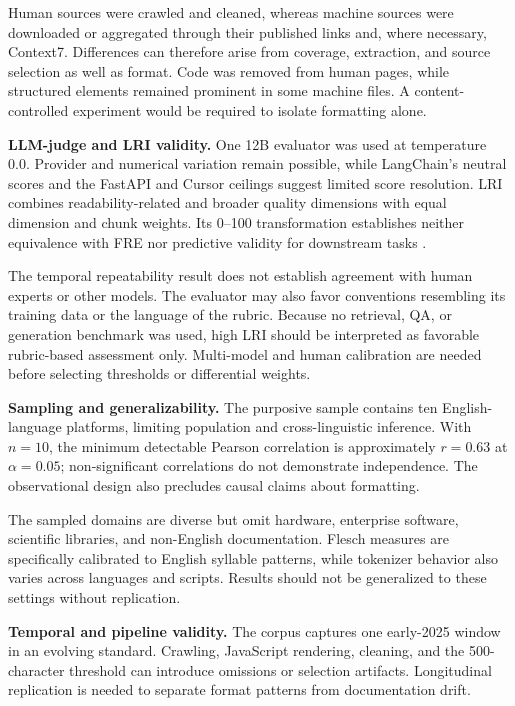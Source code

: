 \documentclass[10pt,conference,a4paper]{IEEEtran}
\begin{document}
Human sources were crawled and cleaned, whereas machine sources were downloaded or aggregated through their published links and, where necessary, Context7. Differences can therefore arise from coverage, extraction, and source selection as well as format. Code was removed from human pages, while structured elements remained prominent in some machine files. A content-controlled experiment would be required to isolate formatting alone.

\textbf{LLM-judge and LRI validity.} One 12B evaluator was used at temperature 0.0. Provider and numerical variation remain possible, while LangChain's neutral scores and the FastAPI and Cursor ceilings suggest limited score resolution. LRI combines readability-related and broader quality dimensions with equal dimension and chunk weights. Its 0--100 transformation establishes neither equivalence with FRE nor predictive validity for downstream tasks \cite{Chen2025}.

The temporal repeatability result does not establish agreement with human experts or other models. The evaluator may also favor conventions resembling its training data or the language of the rubric. Because no retrieval, QA, or generation benchmark was used, high LRI should be interpreted as favorable rubric-based assessment only. Multi-model and human calibration are needed before selecting thresholds or differential weights.

\textbf{Sampling and generalizability.} The purposive sample contains ten English-language platforms, limiting population and cross-linguistic inference. With $n=10$, the minimum detectable Pearson correlation is approximately $r=0.63$ at $\alpha=0.05$; non-significant correlations do not demonstrate independence. The observational design also precludes causal claims about formatting.

The sampled domains are diverse but omit hardware, enterprise software, scientific libraries, and non-English documentation. Flesch measures are specifically calibrated to English syllable patterns, while tokenizer behavior also varies across languages and scripts. Results should not be generalized to these settings without replication.

\textbf{Temporal and pipeline validity.} The corpus captures one early-2025 window in an evolving standard. Crawling, JavaScript rendering, cleaning, and the 500-character threshold can introduce omissions or selection artifacts. Longitudinal replication is needed to separate format patterns from documentation drift.
\end{document}
